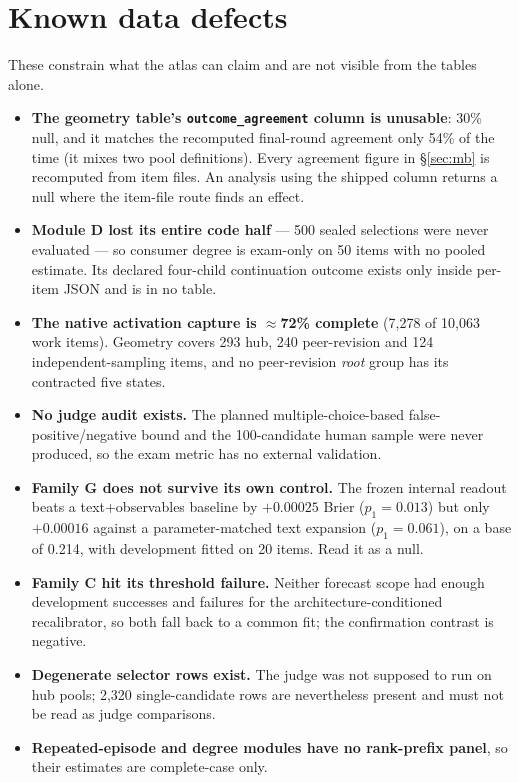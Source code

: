 \documentclass[10pt,a4paper]{article}
\begin{document}
\section{Known data defects}\label{app:defects}
These constrain what the atlas can claim and are not visible from the tables alone.
\begin{itemize}
\item \textbf{The geometry table's \texttt{outcome\_agreement} column is unusable}: 30\% null, and it matches the recomputed final-round agreement only 54\% of the time (it mixes two pool definitions). Every agreement figure in \S\ref{sec:mb} is recomputed from item files. An analysis using the shipped column returns a null where the item-file route finds an effect.
\item \textbf{Module D lost its entire code half} --- 500 sealed selections were never evaluated --- so consumer degree is exam-only on 50 items with no pooled estimate. Its declared four-child continuation outcome exists only inside per-item JSON and is in no table.
\item \textbf{The native activation capture is $\approx$72\% complete} (7{,}278 of 10{,}063 work items). Geometry covers 293 hub, 240 peer-revision and 124 independent-sampling items, and no peer-revision \emph{root} group has its contracted five states.
\item \textbf{No judge audit exists.} The planned multiple-choice-based false-positive/negative bound and the 100-candidate human sample were never produced, so the exam metric has no external validation.
\item \textbf{Family G does not survive its own control.} The frozen internal readout beats a text+observables baseline by $+0.00025$ Brier ($p_1=0.013$) but only $+0.00016$ against a parameter-matched text expansion ($p_1=0.061$), on a base of 0.214, with development fitted on 20 items. Read it as a null.
\item \textbf{Family C hit its threshold failure.} Neither forecast scope had enough development successes and failures for the architecture-conditioned recalibrator, so both fall back to a common fit; the confirmation contrast is negative.
\item \textbf{Degenerate selector rows exist.} The judge was not supposed to run on hub pools; 2{,}320 single-candidate rows are nevertheless present and must not be read as judge comparisons.
\item \textbf{Repeated-episode and degree modules have no rank-prefix panel}, so their estimates are complete-case only.
\end{itemize}
\end{document}
